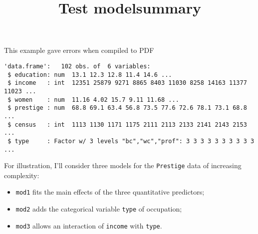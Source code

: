 \documentclass[
  letterpaper,
  DIV=11,
  numbers=noendperiod]{scrartcl}
\title{Test modelsummary}
\author{}
\date{}
\newenvironment{Shaded}{\begin{snugshade}}{\end{snugshade}}
\newcommand{\AttributeTok}[1]{\textcolor[rgb]{0.40,0.45,0.13}{#1}}
\newcommand{\CommentTok}[1]{\textcolor[rgb]{0.37,0.37,0.37}{#1}}
\newcommand{\FunctionTok}[1]{\textcolor[rgb]{0.28,0.35,0.67}{#1}}
\newcommand{\NormalTok}[1]{\textcolor[rgb]{0.00,0.23,0.31}{#1}}
\newcommand{\OtherTok}[1]{\textcolor[rgb]{0.00,0.23,0.31}{#1}}
\newcommand{\SpecialCharTok}[1]{\textcolor[rgb]{0.37,0.37,0.37}{#1}}
\newcommand{\StringTok}[1]{\textcolor[rgb]{0.13,0.47,0.30}{#1}}
\providecommand{\tightlist}{%
  \setlength{\itemsep}{0pt}\setlength{\parskip}{0pt}}
\begin{document}
\maketitle


This example gave errors when compiled to PDF

\begin{Shaded}
\end{Shaded}

\begin{verbatim}
'data.frame':   102 obs. of  6 variables:
 $ education: num  13.1 12.3 12.8 11.4 14.6 ...
 $ income   : int  12351 25879 9271 8865 8403 11030 8258 14163 11377 11023 ...
 $ women    : num  11.16 4.02 15.7 9.11 11.68 ...
 $ prestige : num  68.8 69.1 63.4 56.8 73.5 77.6 72.6 78.1 73.1 68.8 ...
 $ census   : int  1113 1130 1171 1175 2111 2113 2133 2141 2143 2153 ...
 $ type     : Factor w/ 3 levels "bc","wc","prof": 3 3 3 3 3 3 3 3 3 3 ...
\end{verbatim}

For illustration, I'll consider three models for the \texttt{Prestige}
data of increasing complexity:

\begin{itemize}
\tightlist
\item
  \texttt{mod1} fits the main effects of the three quantitative
  predictors;
\item
  \texttt{mod2} adds the categorical variable \texttt{type} of
  occupation;
\item
  \texttt{mod3} allows an interaction of \texttt{income} with
  \texttt{type}.
\end{itemize}
\end{document}
